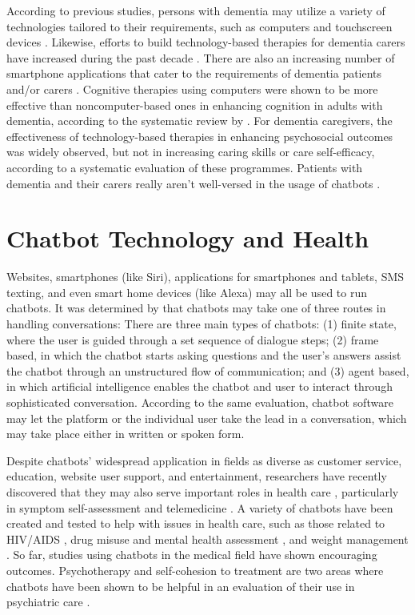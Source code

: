 According to previous studies, persons with dementia may utilize a variety of technologies tailored to their requirements, such as computers \citep{four} and touchscreen devices \citep{five}. Likewise, efforts to build technology-based therapies for dementia carers have increased during the past decade \citep{six}. There are also an increasing number of smartphone applications that cater to the requirements of dementia patients and/or carers \citep{seven}. Cognitive therapies using computers were shown to be more effective than noncomputer-based ones in enhancing cognition in adults with dementia, according to the systematic review by \cite{four}. For dementia caregivers, the effectiveness of technology-based therapies in enhancing psychosocial outcomes was widely observed, but not in increasing caring skills or care self-efficacy, according to a systematic evaluation of these programmes. Patients with dementia and their carers really aren't well-versed in the usage of chatbots \citep{six}.

\section{Chatbot Technology and Health}

Websites, smartphones (like Siri), applications for smartphones and tablets, SMS texting, and even smart home devices (like Alexa) may all be used to run chatbots. It was determined by \cite{lit.ch1} that chatbots may take one of three routes in handling conversations: There are three main types of chatbots: (1) finite state, where the user is guided through a set sequence of dialogue steps; (2) frame based, in which the chatbot starts asking questions and the user's answers assist the chatbot through an unstructured flow of communication; and (3) agent based, in which artificial intelligence enables the chatbot and user to interact through sophisticated conversation. According to the same evaluation, chatbot software may let the platform or the individual user take the lead in a conversation, which may take place either in written or spoken form.

Despite chatbots' widespread application in fields as diverse as customer service, education, website user support, and entertainment, researchers have recently discovered that they may also serve important roles in health care \citep{lit.ch2}, particularly in symptom self-assessment and telemedicine \citep{lit.ch3}. A variety of chatbots have been created and tested to help with issues in health care, such as those related to HIV/AIDS \citep{lit.ch4}, drug misuse and mental health assessment \citep{lit.ch5}, and weight management \citep{lit.ch6}. So far, studies using chatbots in the medical field have shown encouraging outcomes. Psychotherapy and self-cohesion to treatment are two areas where chatbots have been shown to be helpful in an evaluation of their use in psychiatric care \citep{lit.ch7}.

